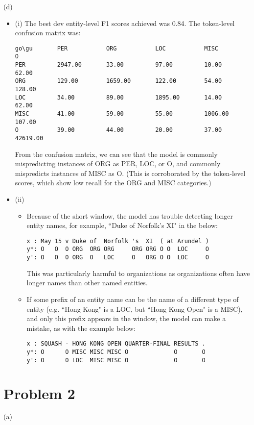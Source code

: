 \documentclass{article}
\begin{document}
(d)
\begin{itemize}
\item (i) The best dev entity-level F1 scores achieved was 0.84. The token-level confusion matrix was:
\begin{verbatim}
go\gu       PER           ORG           LOC           MISC          O
PER         2947.00       33.00         97.00         10.00         62.00
ORG         129.00        1659.00       122.00        54.00         128.00
LOC         34.00         89.00         1895.00       14.00         62.00
MISC        41.00         59.00         55.00         1006.00       107.00
O           39.00         44.00         20.00         37.00         42619.00
\end{verbatim}
From the confusion matrix, we can see that the model is commonly mispredicting instances of ORG as PER, LOC, or O,  and commonly mispredicts instances of MISC as O. (This is corroborated by the token-level scores, which show low recall for the ORG and MISC categories.)
\item (ii)
\begin{itemize}
\item Because of the short window, the model has trouble detecting longer entity names, for example, ``Duke of Norfolk's XI" in the below:
\begin{verbatim}
x : May 15 v Duke of  Norfolk 's  XI  ( at Arundel )
y*: O   O  O ORG  ORG ORG     ORG ORG O O  LOC     O
y': O   O  O ORG  O   LOC     O   ORG O O  LOC     O
\end{verbatim}
This was particularly harmful to organizations as organizations often have longer names than other named entities.
\item If some prefix of an entity name can be the name of a different type of entity (e.g. ``Hong Kong" is a LOC, but ``Hong Kong Open" is a MISC), and only this prefix appears in the window, the model can make a mistake, as with the example below:
\begin{verbatim}
x : SQUASH - HONG KONG OPEN QUARTER-FINAL RESULTS .
y*: O      O MISC MISC MISC O             O       O
y': O      O LOC  MISC MISC O             O       O
\end{verbatim}
\end{itemize}
\end{itemize}

\section{Problem 2}
(a)
\end{document}
